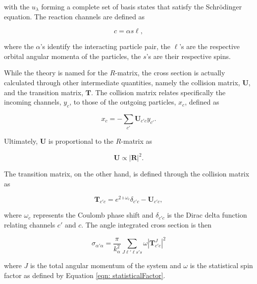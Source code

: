 \noindent with the $u_{\lambda}$ forming a complete set of basis states that satisfy the Schr\"odinger  equation. The reaction channels are defined as 

\begin{equation}
c = \alpha s \ell,
\end{equation}

\noindent where the $\alpha$'s identify the interacting particle pair, the $\ell$'s are the respective orbital angular momenta of the particles, the $s$'s are their respective spins.

While the theory is named for the $R$-matrix, the cross section is actually calculated through other intermediate quantities, namely the collision matrix, $\mathbf{U}$, and the transition matrix, $\mathbf{T}$. The collision matrix relates specifically the incoming channels, $y_{c}$, to those of the outgoing particles, $x_{c}$, defined as

\begin{equation}
x_{c} = - \sum_{c'} \mathbf{U}_{c' c} y_{c'}.
\end{equation}

\noindent Ultimately, $\mathbf{U}$ is proportional to the $R$-matrix as

\begin{equation}
\mathbf{U} \propto | \mathbf{R} |^{2}.
\end{equation}

\noindent The transition matrix, on the other hand, is defined through the collision matrix as 

\begin{equation}
\mathbf{T}_{c' c} = e^{2\imath \omega_{c}} \delta_{c' c} - \mathbf{U}_{c' c},
\end{equation}

\noindent where $\omega_{c}$ represents the Coulomb phase shift and $\delta_{c' c}$ is the Dirac delta function relating channels $c'$ and $c$. The angle integrated cross section is then 

\begin{equation}
\sigma_{\alpha' \alpha} = \dfrac{\pi}{k_{\alpha}^{2}} \sum_{J \ell' \ell s' s} \omega | \mathbf{T}_{c' c}^{J} |^{2}
\end{equation}

\noindent where $J$ is the total angular momentum of the system and $\omega$ is the statistical spin factor as defined by Equation \ref{eqn: statisticalFactor}. 

